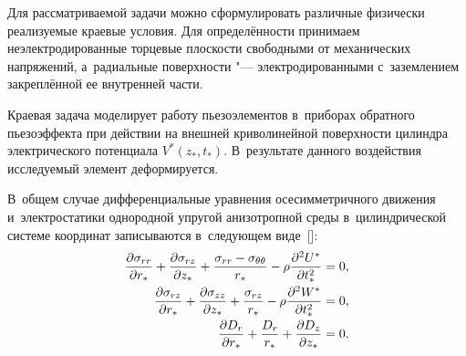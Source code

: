 Для рассматриваемой задачи можно сформулировать различные физически реализуемые краевые условия. 
Для определённости принимаем неэлектродированные торцевые плоскости свободными от механических напряжений, а~радиальные поверхности "--- электродированными с~заземлением закреплённой ее внутренней части.

Краевая задача моделирует работу пьезоэлементов в~приборах обратного пьезоэффекта при действии на внешней криволинейной поверхности цилиндра электрического потенциала $V^*  ( z_* , t_*  )$. 
В~результате данного воздействия исследуемый элемент деформируется.

В~общем случае дифференциальные уравнения осесимметричного движения и~электростатики однородной упругой анизотропной среды в~цилиндрической 
системе координат записываются в~следующем виде~[]:
\begin{equation}
\label{sl:eq1}
\begin{array}{r}
\displaystyle
\frac{\partial \sigma_{rr} }{\partial r_*  }+\frac{\partial \sigma _{rz} }{\partial z_*  }+\frac{\sigma _{rr} -\sigma _{\theta \theta } }{r_*  
}-\rho \frac{\partial ^2U^*  }{\partial t_*  ^2 }=0, \vspace{1mm}
\\
\displaystyle
\frac{\partial \sigma _{rz} }{\partial r_*  }+\frac{\partial \sigma _{zz} }{\partial z_*  }+\frac{\sigma _{rz} }{r_*  }-\rho \frac{\partial 
^2W^*  }{\partial t_*  ^2 }=0, \vspace{1mm}
\\
\displaystyle
\frac{\partial D_r }{\partial r_*  }+\frac{D_r }{r_*  }+\frac{\partial 
D_z }{\partial z_*  }=0.
\end{array}
\end{equation}

